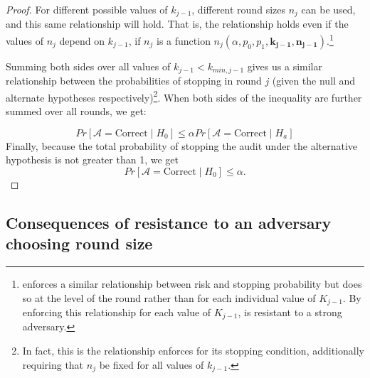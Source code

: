 \begin{proof}
For different possible values of $k_{j-1}$, different round sizes $n_j$ can be used, and this same relationship will hold. 
That is, the relationship holds even if the values of $n_{j}$ depend on $k_{j-1}$, if $n_j$ is a function $n_j(\alpha, p_0, p_1, \bm{k_{j-1}}, \bm{n_{j-1}})$.\footnote{\Minerva enforces a similar relationship between risk and stopping probability but does so at the level of the round rather than for each individual value of $K_{j-1}$. By enforcing this relationship for each value of $K_{j-1}$, \Providence is resistant to a strong adversary.}

Summing both sides over all values of $k_{j-1} < k_{min, j-1}$ gives us a similar relationship between the probabilities of stopping in round $j$ (given the null and alternate hypotheses respectively)\footnote{In fact, this is the relationship \Minerva enforces for its stopping condition, additionally requiring that $n_j$ be fixed for all values of $k_{j-1}$.}. 
When both sides of the inequality are further summed over all rounds, we get:  

$$
Pr[\mathcal{A}=\text{Correct} \mid H_0]
\le
\alpha Pr[\mathcal{A}=\text{Correct} \mid H_a]
$$
Finally, because the total probability of stopping the audit under
the alternative hypothesis is not greater than 1, we get
$$
Pr[\mathcal{A}=\text{Correct} \mid H_0] \le
\alpha.
$$
\end{proof}

\subsection{Consequences of resistance to an adversary choosing round size}
\label{sec:adversary}

